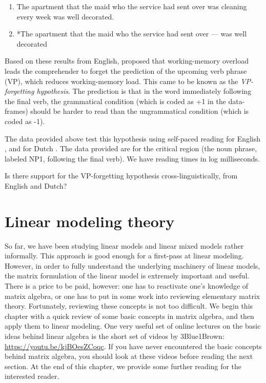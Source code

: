 \documentclass[
  12pt,
]{krantz}
\theoremstyle{definition}
\theoremstyle{definition}
\theoremstyle{definition}
\theoremstyle{definition}
\theoremstyle{remark}
\begin{document}
\begin{enumerate}
\def\labelenumi{(\alph{enumi})}
\item
  The apartment that the maid who the service had sent over was cleaning every week was well decorated.
\item
  *The apartment that the maid who the service had sent over --- was well decorated
\end{enumerate}

Based on these results from English, \citet{gibsonthomas99} proposed that working-memory overload leads the comprehender to forget the prediction of the upcoming verb phrase (VP), which reduces working-memory load. This came to be known as the \emph{VP-forgetting hypothesis}. The prediction is that in the word immediately following the final verb, the grammatical condition (which is coded as +1 in the data-frames) should be harder to read than the ungrammatical condition (which is coded as -1).

The data provided above test this hypothesis using self-paced reading for English \citep{VSLK08}, and for Dutch \citep{FrankEtAl2015}. The data provided are for the critical region (the noun phrase, labeled NP1, following the final verb). We have reading times in log milliseconds.

Is there support for the VP-forgetting hypothesis cross-linguistically, from English and Dutch?

\hypertarget{ch:LMtheory}{%
\chapter{Linear modeling theory}\label{ch:LMtheory}}

So far, we have been studying linear models and linear mixed models rather informally. This approach is good enough for a first-pass at linear modeling. However, in order to fully understand the underlying machinery of linear models, the matrix formulation of the linear model is extremely important and useful. There is a price to be paid, however: one has to reactivate one's knowledge of matrix algebra, or one has to put in some work into reviewing elementary matrix theory. Fortunately, reviewing these concepts is not too difficult. We begin this chapter with a quick review of some basic concepts in matrix algebra, and then apply them to linear modeling. One very useful set of online lectures on the basic ideas behind linear algebra is the short set of videos by 3Blue1Brown: \url{https://youtu.be/kjBOesZCoqc}. If you have never encountered the basic concepts behind matrix algebra, you should look at these videos before reading the next section. At the end of this chapter, we provide some further reading for the interested reader.
\end{document}
